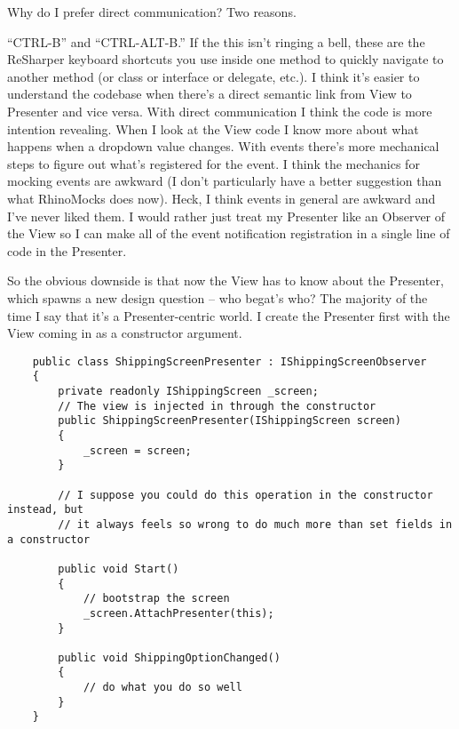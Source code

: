 \documentclass{article}
\begin{document}
{Why do I prefer direct communication?  Two reasons.   

    “CTRL-B” and “CTRL-ALT-B.”  If the this isn't ringing a bell, these are the ReSharper keyboard shortcuts you use inside one method to quickly navigate to another method (or class or interface or delegate, etc.).  I think it's easier to understand the codebase when there's a direct semantic link from View to Presenter and vice versa.  With direct communication I think the code is more intention revealing.  When I look at the View code I know more about what happens when a dropdown value changes.  With events there's more mechanical steps to figure out what's registered for the event.
    I think the mechanics for mocking events are awkward (I don't particularly have a better suggestion than what RhinoMocks does now).  Heck, I think events in general are awkward and I've never liked them.  I would rather just treat my Presenter like an Observer of the View so I can make all of the event notification registration in a single line of code in the Presenter. 

So the obvious downside is that now the View has to know about the Presenter, which spawns a new design question – who begat's who?  The majority of the time I say that it's a Presenter-centric world.  I create the Presenter first with the View coming in as a constructor argument.
\newpage
 \begin{lstlisting}
    public class ShippingScreenPresenter : IShippingScreenObserver
    {
        private readonly IShippingScreen _screen;
        // The view is injected in through the constructor
        public ShippingScreenPresenter(IShippingScreen screen)
        {
            _screen = screen;
        } 

        // I suppose you could do this operation in the constructor instead, but
        // it always feels so wrong to do much more than set fields in a constructor
		
        public void Start()
        {
            // bootstrap the screen
            _screen.AttachPresenter(this);
        } 

        public void ShippingOptionChanged()
        {
            // do what you do so well
        }
    }
 \end{lstlisting}

}
\end{document}
